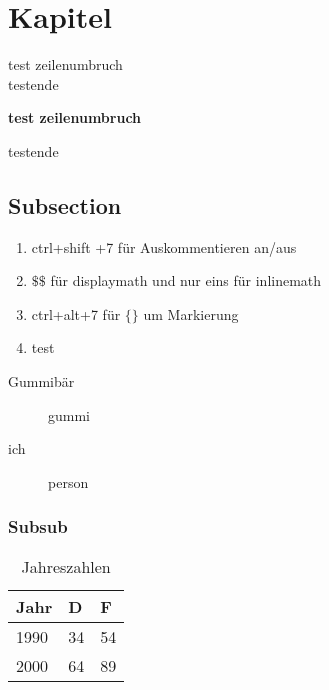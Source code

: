 \documentclass{scrartcl}
\begin{document}
\tableofcontents

  \section{Kapitel}
  test zeilenumbruch\\
  testende

  \textbf{test zeilenumbruch}

testende

  \subsection{Subsection}
  \begin{enumerate}
    \item
    ctrl+shift +7 für Auskommentieren an/aus
    \item
    \(\$\$\) für displaymath und nur eins für inlinemath
    \item
    ctrl+alt+7 für \(\{\}\) um Markierung
    \item
    test

  \end{enumerate}

\begin{description}
  \item[Gummibär] gummi
  \item[ich] person
\end{description}
  \subsubsection{Subsub}
  \begin{table}[h]
    \centering
    \begin{tabular}{l|ll}
      \textbf{Jahr} & \textbf{D} & \textbf{F}
      \\  \hline
      1990 & 34 & 54  \\
      2000 & 64 & 89
    \end{tabular}
    \caption{Jahreszahlen}
    \label{tbl:einwohner}
  \end{table}
\end{document}
